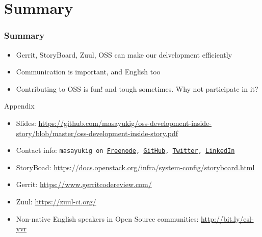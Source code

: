 \documentclass[aspectratio=169,11pt,hyperref={colorlinks=true}]{beamer}
\begin{document}
\section{Summary}
\begin{frame}
  \frametitle{Summary}
  \begin{itemize}
    \item Gerrit, StoryBoard, Zuul, OSS can make our delvelopment efficiently
    \item Communication is important, and English too
    \item Contributing to OSS is fun! and tough sometimes. Why not participate in it?
  \end{itemize}
  Appendix
  \begin{itemize}
      \item Slides: \url{https://github.com/masayukig/oss-development-inside-story/blob/master/oss-development-inside-story.pdf}
      \item Contact info: \texttt{masayukig on
        \href{https://freenode.net/}{Freenode},
        \href{https://github.com/masayukig}{GitHub},
        \href{https://twitter.com/masayukig}{Twitter},
        \href{https://www.linkedin.com/in/masayukig/}{LinkedIn}}
      \item StoryBoad: \url{https://docs.openstack.org/infra/system-config/storyboard.html}
      \item Gerrit: \url{https://www.gerritcodereview.com/}
      \item Zuul: \url{https://zuul-ci.org/}
      \item Non-native English speakers in Open Source communities: \url{http://bit.ly/esl-yvr}
  \end{itemize}
\end{frame}
\end{document}
